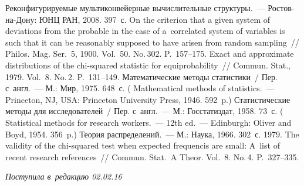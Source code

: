 \begin{multicols}{2}
    
{\small\frenchspacing
 {%
 \begin{thebibliography}{9}
Реконфигурируемые мультиконвейерные вычислительные структуры.~--- 
Ростов-на-Дону: ЮНЦ РАН, 2008. 397~с.
     On the criterion that a given system of deviations from 
the probable in the case of a~correlated system of variables is such that it can be 
reasonably supposed to have arisen from random sampling~// Philos. 
Mag. Ser.~5, 1900. Vol.~50. No.\,302. P.~157--175.
     Exact 
and approximate distributions of the chi-squared statistic for equiprobability~// 
Commun. Stat., 1979. Vol.~8. No.\,2. P.~131--149.
     Математические методы статистики~/
    Пер. с~англ.~--- М.: Мир, 
1975. 648~с. ( {Mathematical methods of statistics}.~--- 
Princeton, NJ, USA: Princeton University Press, 1946. 592~p.)
     Статистические методы для исследователей~/
    Пер. с~англ.~--- 
М.: Госстатиздат, 1958. 73~с.
( {Statistical methods for research 
workers}.~--- 12th ed.~--- Edinburgh: Oliver and Boyd, 1954. 356~p.)
     Теория распределений.~--- М.: 
Наука, 1966. 302~с.
 1979. The validity of the chi-squared test when expected
frequencis are small: A~list of recent research references~//
{Commun. Stat.~A Theor.} Vol.~8. No.\,4. P.~327--335.
 \end{thebibliography}

 }
 }

\end{multicols}

\vspace*{-6pt}

\hfill{\small\textit{Поступила в~редакцию 02.02.16}}


\newpage

\vspace*{-28pt}

